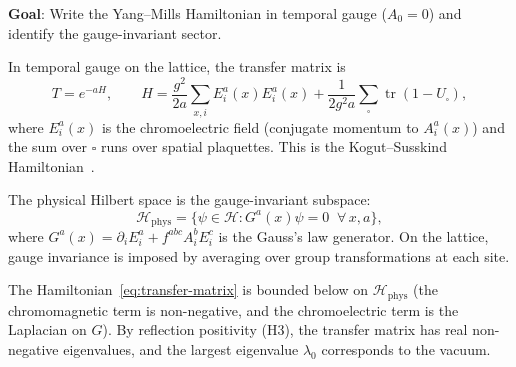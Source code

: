 \documentclass[11pt]{article}
\DeclareMathOperator{\tr}{tr}
\begin{document}
\textbf{Goal}: Write the Yang--Mills Hamiltonian in temporal gauge
($A_0 = 0$) and identify the gauge-invariant sector.

In temporal gauge on the lattice, the transfer matrix is
\begin{equation}\label{eq:transfer-matrix}
  T = e^{-aH}, \qquad
  H = \frac{g^2}{2a}\sum_{x,i} E_i^a(x) E_i^a(x)
  + \frac{1}{2g^2 a}\sum_{\square} \tr(1 - U_\square),
\end{equation}
where $E_i^a(x)$ is the chromoelectric field (conjugate momentum to
$A_i^a(x)$) and the sum over $\square$ runs over spatial plaquettes.
This is the Kogut--Susskind Hamiltonian~\cite{KS}.

The physical Hilbert space is the gauge-invariant subspace:
\begin{equation}\label{eq:gauss-law}
  \mathcal{H}_{\mathrm{phys}} =
  \bigl\{\psi \in \mathcal{H} : G^a(x)\psi = 0
  \;\;\forall\, x, a\bigr\},
\end{equation}
where $G^a(x) = \partial_i E_i^a + f^{abc} A_i^b E_i^c$ is the
Gauss's law generator.  On the lattice, gauge invariance is imposed by
averaging over group transformations at each site.

The Hamiltonian~\eqref{eq:transfer-matrix} is bounded below on
$\mathcal{H}_{\mathrm{phys}}$ (the chromomagnetic term is
non-negative, and the chromoelectric term is the Laplacian on $G$).
By reflection positivity (H3), the transfer matrix has real
non-negative eigenvalues, and the largest eigenvalue $\lambda_0$
corresponds to the vacuum.
\end{document}
